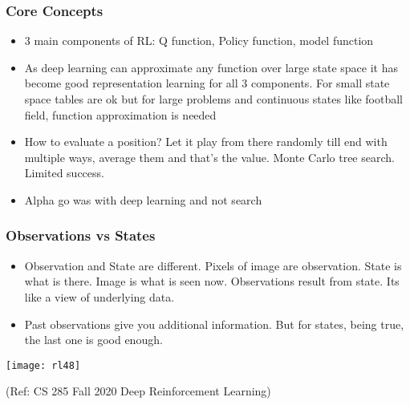 \begin{frame}[fragile]\frametitle{Core Concepts}


\begin{itemize}
\item 3 main components of RL: Q function, Policy function, model function
\item As deep learning can approximate any function over large state space it has become good representation learning for all 3 components. For small state space tables are ok but for large problems and continuous states like football field, function approximation is needed
\item How to evaluate a position? Let it play from there randomly till end with multiple ways, average them and that's the value. Monte Carlo tree search. Limited success.
\item Alpha go was with deep learning and not search

\end{itemize}

\end{frame}

\begin{frame}[fragile]\frametitle{Observations vs States}

\begin{itemize}
\item Observation and State are different. Pixels of image are observation. State is what is there. Image is what is seen now. Observations result from state. Its like a view of underlying data.
\item Past observations give you additional information. But for states, being true, the last one is good enough.
\end{itemize}


\begin{center}
\texttt{[image: rl48]}
\end{center}


{\tiny (Ref: CS 285 Fall 2020 Deep Reinforcement Learning)}

\end{frame}

